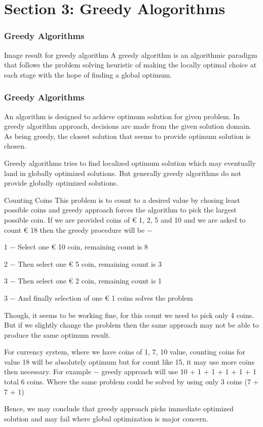 \documentclass{beamer}
\begin{document}
\section{Section 3: Greedy Alogorithms}
\begin{frame}
\frametitle{Greedy Algorithms}
\large

Image result for greedy algorithm
A greedy algorithm is an algorithmic paradigm that follows the problem solving heuristic of making the locally optimal choice at each stage with the hope of finding a global optimum.
\end{frame}
\begin{frame}
\frametitle{Greedy Algorithms}
\large
An algorithm is designed to achieve optimum solution for given problem. In greedy algorithm approach, decisions are made from the given solution domain. As being greedy, the closest solution that seems to provide optimum solution is chosen.

Greedy algorithms tries to find localized optimum solution which may eventually land in globally optimized solutions. But generally greedy algorithms do not provide globally optimized solutions.
\end{frame}
\begin{frame}
Counting Coins
This problem is to count to a desired value by chosing least possible coins and greedy approach forces the algorithm to pick the largest possible coin. If we are provided coins of € 1, 2, 5 and 10 and we are asked to count € 18 then the greedy procedure will be −

1 − Select one € 10 coin, remaining count is 8

2 − Then select one € 5 coin, remaining count is 3

3 − Then select one € 2 coin, remaining count is 1

3 − And finally selection of one € 1 coins solves the problem
\end{frame}
\begin{frame}

Though, it seems to be working fine, for this count we need to pick only 4 coins. But if we slightly change the problem then the same approach may not be able to produce the same optimum result.

For currency system, where we have coins of 1, 7, 10 value, counting coins for value 18 will be absolutely optimum but for count like 15, it may use more coins then necessary. For example − greedy approach will use 10 + 1 + 1 + 1 + 1 + 1 total 6 coins. Where the same problem could be solved by using only 3 coins (7 + 7 + 1)

Hence, we may conclude that greedy approach picks immediate optimized solution and may fail where global optimization is major concern.
\end{frame}
\end{document}
